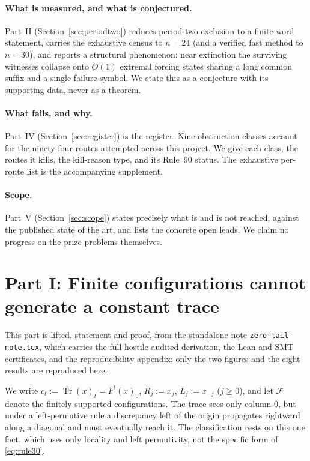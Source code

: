 \documentclass[11pt]{article}
\theoremstyle{definition}
\newcommand{\F}{\mathcal F}
\newcommand{\Tr}{\operatorname{Tr}}
\begin{document}
\paragraph{What is measured, and what is conjectured.} Part~II
(Section~\ref{sec:periodtwo}) reduces period-two exclusion to a finite-word
statement, carries the exhaustive census to $n=24$ (and a verified fast method to
$n=30$), and reports a structural phenomenon: near extinction the surviving
witnesses collapse onto $O(1)$ extremal forcing states sharing a long common
suffix and a single failure symbol. We state this as a conjecture with its
supporting data, never as a theorem.

\paragraph{What fails, and why.} Part~IV (Section~\ref{sec:register}) is the
register. Nine obstruction classes account for the ninety-four
routes attempted across this project. We give each class, the routes it kills,
the kill-reason type, and its Rule~90 status. The exhaustive per-route list is
the accompanying supplement.

\paragraph{Scope.} Part~V (Section~\ref{sec:scope}) states precisely what is and
is not reached, against the published state of the art, and lists the concrete
open leads. We claim no progress on the prize problems themselves.

\section{Part I: Finite configurations cannot generate a constant trace}
\label{sec:periodone}

This part is lifted, statement and proof, from the standalone note
\texttt{zero-tail-note.tex}, which carries the full hostile-audited derivation,
the Lean and SMT certificates, and the reproducibility appendix; only the two
figures and the eight results are reproduced here.

We write $c_t:=\Tr(x)_t=F^t(x)_0$, $R_j:=x_j$, $L_j:=x_{-j}$ ($j\ge0$), and let
$\F$ denote the finitely supported configurations. The trace sees only column
$0$, but under a left-permutive rule a discrepancy left of the origin
propagates rightward along a diagonal and must eventually reach it. The
classification rests on this one fact, which uses only locality and left
permutivity, not the specific form of \eqref{eq:rule30}.
\end{document}
